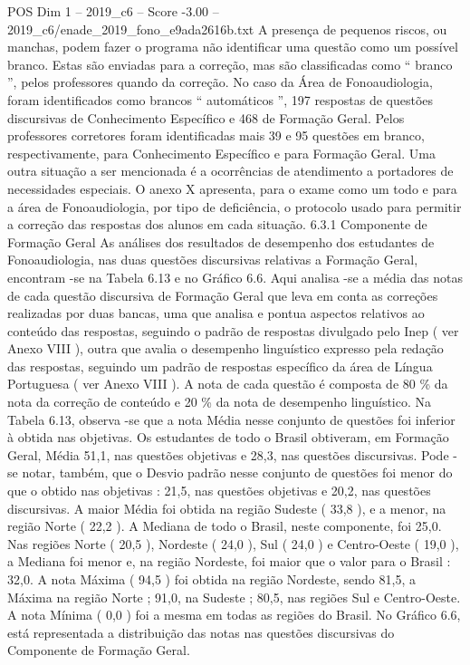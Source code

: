 \begin{textsample}{POS Dim 1 – 2019\_c6 – Score -3.00 – 2019\_c6/enade\_2019\_fono\_e9ada2616b.txt}
A presença de pequenos riscos, ou manchas, podem fazer o programa não identificar uma questão como um possível branco.
Estas são enviadas para a correção, mas são classificadas como “ branco ”, pelos professores quando da correção.
No caso da Área de Fonoaudiologia, foram identificados como brancos “ automáticos ”, 197 respostas de questões discursivas de Conhecimento Específico e 468 de Formação Geral.
Pelos professores corretores foram identificadas mais 39 e 95 questões em branco, respectivamente, para Conhecimento Específico e para Formação Geral.
Uma outra situação a ser mencionada é a ocorrências de atendimento a portadores de necessidades especiais.
O anexo X apresenta, para o exame como um todo e para a área de Fonoaudiologia, por tipo de deficiência, o protocolo usado para permitir a correção das respostas dos alunos em cada situação. 6.3.1 Componente de Formação Geral As análises dos resultados de desempenho dos estudantes de Fonoaudiologia, nas duas questões discursivas relativas a Formação Geral, encontram -se na Tabela 6.13 e no Gráfico 6.6.
Aqui analisa -se a média das notas de cada questão discursiva de Formação Geral que leva em conta as correções realizadas por duas bancas, uma que analisa e pontua aspectos relativos ao conteúdo das respostas, seguindo o padrão de respostas divulgado pelo Inep ( ver Anexo VIII ), outra que avalia o desempenho linguístico expresso pela redação das respostas, seguindo um padrão de respostas específico da área de Língua Portuguesa ( ver Anexo VIII ).
A nota de cada questão é composta de 80 \% da nota da correção de conteúdo e 20 \% da nota de desempenho linguístico.
Na Tabela 6.13, observa -se que a nota Média nesse conjunto de questões foi inferior à obtida nas objetivas.
Os estudantes de todo o Brasil obtiveram, em Formação Geral, Média 51,1, nas questões objetivas e 28,3, nas questões discursivas.
Pode -se notar, também, que o Desvio padrão nesse conjunto de questões foi menor do que o obtido nas objetivas : 21,5, nas questões objetivas e 20,2, nas questões discursivas.
A maior Média foi obtida na região Sudeste ( 33,8 ), e a menor, na região Norte ( 22,2 ).
A Mediana de todo o Brasil, neste componente, foi 25,0.
Nas regiões Norte ( 20,5 ), Nordeste ( 24,0 ), Sul ( 24,0 ) e Centro-Oeste ( 19,0 ), a Mediana foi menor e, na região Nordeste, foi maior que o valor para o Brasil : 32,0.
A nota Máxima ( 94,5 ) foi obtida na região Nordeste, sendo 81,5, a Máxima na região Norte ; 91,0, na Sudeste ; 80,5, nas regiões Sul e Centro-Oeste.
A nota Mínima ( 0,0 ) foi a mesma em todas as regiões do Brasil.
No Gráfico 6.6, está representada a distribuição das notas nas questões discursivas do Componente de Formação Geral.

\end{textsample}
